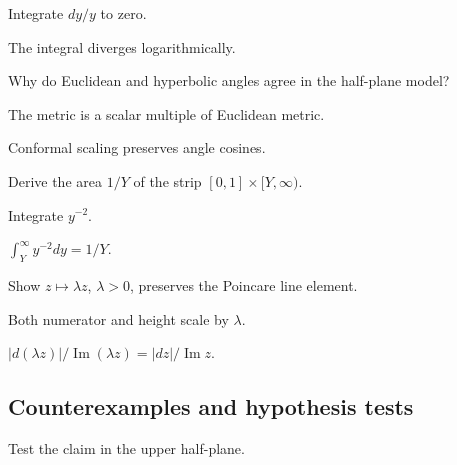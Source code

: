 \begin{hint}
Integrate \(dy/y\) to zero.
\end{hint}

\begin{solution}
The integral diverges logarithmically.
\end{solution}

\begin{exercise}\label{exr:vii32-ped-07}
Why do Euclidean and hyperbolic angles agree in the half-plane model?
\end{exercise}

\begin{hint}
The metric is a scalar multiple of Euclidean metric.
\end{hint}

\begin{solution}
Conformal scaling preserves angle cosines.
\end{solution}

\begin{exercise}\label{exr:vii32-ped-08}
Derive the area \(1/Y\) of the strip \([0,1]\times[Y,\infty)\).
\end{exercise}

\begin{hint}
Integrate \(y^{-2}\).
\end{hint}

\begin{solution}
\(\int_Y^\infty y^{-2}dy=1/Y\).
\end{solution}

\begin{exercise}\label{exr:vii32-ped-09}
Show \(z\mapsto\lambda z\), \(\lambda>0\), preserves the Poincare line element.
\end{exercise}

\begin{hint}
Both numerator and height scale by \(\lambda\).
\end{hint}

\begin{solution}
\(|d(\lambda z)|/\operatorname{Im}(\lambda z)=|dz|/\operatorname{Im}z\).
\end{solution}

\subsection*{Counterexamples and hypothesis tests}

\begin{exercise}\label{exr:vii32-ped-10}
Test the claim in the upper half-plane.
\end{exercise}

